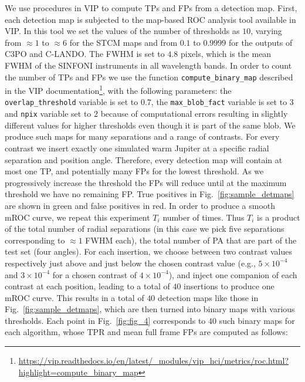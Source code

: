 \documentclass{aa}
\begin{document}
We use procedures in VIP \citep{2017AJGomezVIP,2023Christiaens} to compute TPs and FPs from a detection map. First, each detection map is subjected to the map-based ROC analysis tool available in VIP. In this tool we set the values of the number of thresholds as $10$, varying from $\approx 1$ to $\approx 6$ for the STCM maps and from $0.1$ to $0.9999$ for the outputs of C3PO and C-LANDO. The FWHM is set to $4.8$ pixels, which is the mean FWHM of the SINFONI instruments in all wavelength bands. 
In order to count the number of TPs and FPs we use the function \texttt{compute\_binary\_map} described in the VIP documentation\footnote{\url{https://vip.readthedocs.io/en/latest/_modules/vip_hci/metrics/roc.html?highlight=compute_binary_map}}, with the following parameters: the \texttt{overlap\_threshold} variable is set to $0.7$, the \texttt{max\_blob\_fact} variable is set to $3$ and \texttt{npix} variable set to $2$ because of computational errors resulting in slightly different values for higher thresholds even though it is part of the same blob.
We produce such maps for many separations and a range of contrasts.
For every contrast we insert exactly one simulated warm Jupiter at a specific radial separation and position angle.
Therefore, every detection map will contain at most one TP, and potentially many FPs for the lowest threshold. 
As we progressively increase the threshold the FPs will reduce until at the maximum threshold we have no remaining FP. 
True positives in Fig.~\ref{fig:sample_detmaps} are shown in green and false positives in red.
In order to produce a smooth mROC curve, we repeat this experiment $T_{i}$ number of times.
Thus $T_{i}$ is a product of the total number of radial separations (in this case we pick five separations corresponding to $\approx 1$ FWHM each), the total number of PA that are part of the test set (four angles).
For each insertion, we choose between two contrast values respectively just above and just below the chosen contrast value (e.g., $5\times10^{-4}$ and $3\times10^{-4}$ for a chosen contrast of $4\times10^{-4}$), and inject one companion of each contrast at each position, leading to a total of $40$ insertions to produce one mROC curve.
This results in a total of $40$ detection maps like those in Fig.~\ref{fig:sample_detmaps}, which are then turned into binary maps with various thresholds. 
Each point in Fig.~\ref{fig:fig_4} corresponds to $40$ such binary maps for each algorithm, whose TPR and mean full frame FPs are computed as follows:
\end{document}
